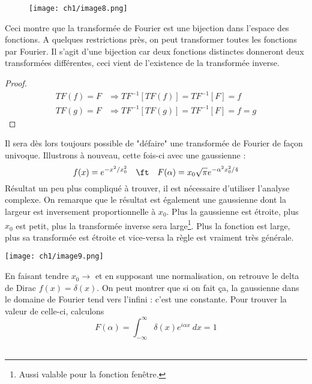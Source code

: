 \begin{wrapfigure}[6]{l}{5.5cm}
\vspace{-10mm}
\texttt{[image: ch1/image8.png]}
\end{wrapfigure}
Ceci montre que la transformée de Fourier est une bijection dans l'espace des fonctions. A 
quelques restrictions près, on peut transformer toutes les fonctions par Fourier. Il s'agit 
d'une bijection car deux fonctions distinctes donneront deux transformées différentes, ceci 
vient de l'existence de la transformée inverse. 
\begin{proof}\ \\
\begin{equation}
\begin{array}{ll}
TF(f) = F &\Longrightarrow TF^{-1}[TF(f)] = TF^{-1}[F] = f\\
TF(g) = F &\Longrightarrow TF^{-1}[TF(g)] = TF^{-1}[F] = f = g
\end{array}
\end{equation}
\end{proof}
Il sera dès lors toujours possible de "défaire" une transformée de Fourier de façon univoque. 
Illustrons à nouveau, cette fois-ci avec une gaussienne :
\begin{equation}
f(x) = e^{-x^2/x_0^2}\quad \ft \quad F(\alpha) = x_0\sqrt{\pi}e^{-\alpha^2x_0^2/4}
\end{equation}
Résultat un peu plus compliqué à trouver, il est nécessaire d'utiliser l’analyse complexe. On 
remarque que le résultat est également une gaussienne dont la largeur est inversement 
proportionnelle à $x_0$. Plus la gaussienne est étroite, plus $x_0$ est petit, plus la transformée 
inverse sera large\footnote{Aussi valable pour la fonction fenêtre.}.
Plus la fonction est large, plus sa transformée est étroite et vice-versa la règle est vraiment 
très générale.
\begin{center}
\texttt{[image: ch1/image9.png]}
\end{center}

En faisant tendre $x_0 \rightarrow$ et en supposant une normalisation, on retrouve le delta de 
Dirac $f(x) = \delta(x)$. On peut montrer que si on fait ça, la gaussienne dans le domaine de 
Fourier tend vers l'infini : c'est une constante. Pour trouver la valeur de celle-ci, calculons
\begin{equation}
F(\alpha) = \int_{-\infty}^\infty \delta(x) e^{i\alpha x}\ dx = 1
\end{equation}\\

